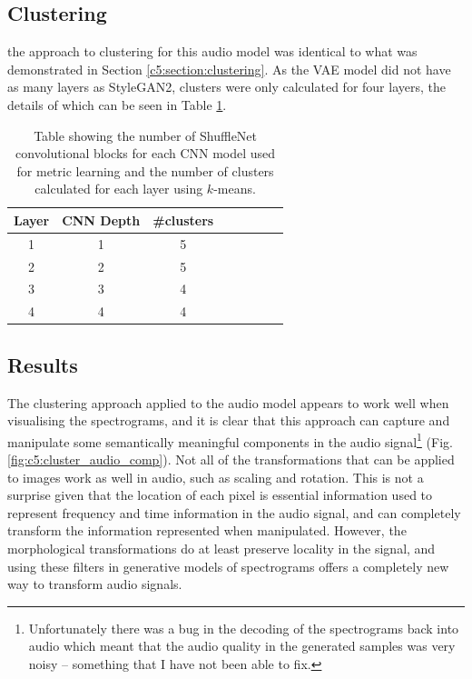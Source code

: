 \subsection{Clustering}

the approach to clustering for this audio model was identical to what was demonstrated in Section \ref{c5:section:clustering}.
As the VAE model did not have as many layers as StyleGAN2, clusters were only calculated for four layers, the details of which can be seen in Table \ref{tab:c5:audio-clustering}.

\begin{table}[]
    \centering
    \begin{tabular}{|c|c|c|c|c|c|c|c|}
    \hline
    Layer & CNN Depth & \#clusters \\
    \hline
    1     & 1 &   5 \\
    2     & 2 &   5 \\
    3     & 3 &   4 \\
    4     & 4 &  4 \\
    \hline
    \end{tabular}
    \medskip
    \caption{\label{tab:c5:audio-clustering}Table showing the number of ShuffleNet \citep{zhang2018shufflenet} convolutional blocks for each CNN model used for metric learning and the number of clusters calculated for each layer using $k$-means.}
    
    \end{table}

\subsection{Results}

The clustering approach applied to the audio model appears to work well when visualising the spectrograms, and it is clear that this approach can capture and manipulate some semantically meaningful components in the audio signal\footnote{Unfortunately there was a bug in the decoding of the spectrograms back into audio which meant that the audio quality in the generated samples was very noisy -- something that I have not been able to fix.}  (Fig. \ref{fig:c5:cluster_audio_comp}). 
Not all of the transformations that can be applied to images work as well in audio, such as scaling and rotation.
This is not a surprise given that the location of each pixel is essential information used to represent frequency and time information in the audio signal, and can completely transform the information represented when manipulated.
However, the morphological transformations do at least preserve locality in the signal, and using these filters in generative models of spectrograms offers a completely new way to transform audio signals.

